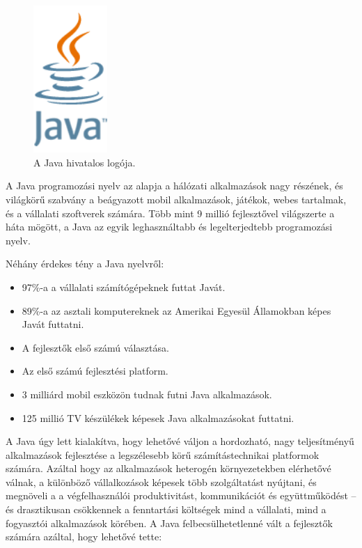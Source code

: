 \documentclass[a4paper,12pt]{report}
\begin{document}
\begin{figure}[ht]
\centerline{
\includegraphics[width=1.1in]{img/javalogo}}
\caption{A Java hivatalos logója.}
\label{javalogo}
\end{figure}

A Java programozási nyelv az alapja a hálózati alkalmazások nagy részének, és világkörű szabvány a beágyazott mobil alkalmazások, játékok, webes tartalmak, és a vállalati szoftverek számára. Több mint 9 millió fejlesztővel világszerte a háta mögött, a Java az egyik leghasználtabb és legelterjedtebb programozási nyelv. 

\vspace{2mm}
Néhány érdekes tény a Java nyelvről:

\begin{itemize}
\item 97\%-a a vállalati számítógépeknek futtat Javát.
\item 89\%-a az asztali komputereknek az Amerikai Egyesül Államokban képes Javát futtatni.
\item A fejlesztők első számú választása.
\item Az első számú fejlesztési platform.
\item 3 milliárd mobil eszközön tudnak futni Java alkalmazások.
\item 125 millió TV készülékek képesek Java alkalmazásokat futtatni.
\end{itemize}

\vspace{2mm}
A Java úgy lett kialakítva, hogy lehetővé váljon a hordozható, nagy teljesítményű alkalmazások fejlesztése a legszélesebb körű számítástechnikai platformok számára. Azáltal hogy az alkalmazások heterogén környezetekben elérhetővé válnak, a különböző vállalkozások képesek több szolgáltatást nyújtani, és megnöveli a a végfelhasználói produktivitást, kommunikációt és együttműködést -- és drasztikusan csökkennek a fenntartási költségek mind a vállalati, mind a fogyasztói alkalmazások körében. A Java felbecsülhetetlenné vált a fejlesztők számára azáltal, hogy lehetővé tette:
\end{document}
